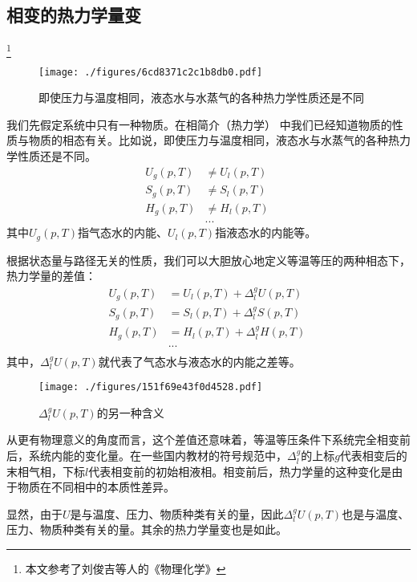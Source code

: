 

\subsection{相变的热力学量变}
\footnote{本文参考了刘俊吉等人的《物理化学》}
\begin{figure}[ht]
\centering
\texttt{[image: ./figures/6cd8371c2c1b8db0.pdf]}
\caption{即使压力与温度相同，液态水与水蒸气的各种热力学性质还是不同} \label{fig_PTTVC2_1}
\end{figure}

我们先假定系统中只有一种物质。在相简介（热力学） 中我们已经知道物质的性质与物质的相态有关。比如说，即使压力与温度相同，液态水与水蒸气的各种热力学性质还是不同。
$$
\begin{aligned}
U_g(p,T) &\ne U_l(p,T)\\
S_g(p,T) &\ne S_l(p,T)\\
H_g(p,T) &\ne H_l(p,T)\\
&...
\end{aligned}~
$$
其中$U_g(p,T)$指气态水的内能、$U_l(p,T)$指液态水的内能等。

根据状态量与路径无关的性质，我们可以大胆放心地定义等温等压的两种相态下，热力学量的差值：
$$
\begin{aligned}
U_g(p,T) &= U_l(p,T) + \Delta ^ g_l U (p,T)\\
S_g(p,T) &= S_l(p,T) + \Delta ^ g_l S (p,T)\\
H_g(p,T) &= H_l(p,T) + \Delta ^ g_l H (p,T)\\
&...\\
\end{aligned}~
$$
其中，$\Delta ^ g_l U (p,T)$就代表了气态水与液态水的内能之差等。
\begin{figure}[ht]
\centering
\texttt{[image: ./figures/151f69e43f0d4528.pdf]}
\caption{$\Delta ^ g_l U (p,T)$的另一种含义} \label{fig_PTTVC2_2}
\end{figure}
从更有物理意义的角度而言，这个差值还意味着，等温等压条件下系统完全相变前后，系统内能的变化量。在一些国内教材的符号规范中，$\Delta^g_l$的上标$g$代表相变后的末相气相，下标$l$代表相变前的初始相液相。相变前后，热力学量的这种变化是由于物质在不同相中的本质性差异。

显然，由于$U$是与温度、压力、物质种类有关的量，因此$\Delta ^ g_l U (p,T)$也是与温度、压力、物质种类有关的量。其余的热力学量变也是如此。

